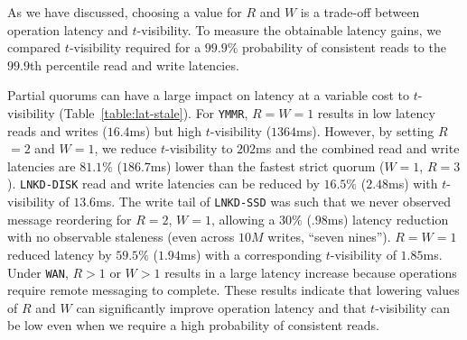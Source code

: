 \documentclass{vldb}
\begin{document}
As we have discussed, choosing a value for $R$ and $W$ is a trade-off
between operation latency and $t$-visibility. To measure the
obtainable latency gains, we compared $t$-visibility required for a
$99.9\%$ probability of consistent reads to the $99.9$th percentile
read and write latencies.

Partial quorums can have a large impact on latency at a variable cost
to $t$-visibility (Table~\ref{table:lat-stale}).  For \texttt{YMMR},
$R$$=$$W$$=$$1$ results in low latency reads and writes ($16.4$ms) but
high $t$-visibility ($1364$ms). However, by setting $R$$=$$2$ and
$W$$=$$1$, we reduce $t$-visibility to $202$ms and the combined read
and write latencies are $81.1\%$ ($186.7$ms) lower than the fastest
strict quorum ($W$$=$$1$, $R$$=$$3$).  \texttt{LNKD-DISK}
read and write latencies can be reduced by $16.5\%$ ($2.48$ms) with
$t$-visibility of $13.6$ms.  The write tail of \texttt{LNKD-SSD} was
such that we never observed message reordering for $R$$=$$2$,
$W$$=$$1$, allowing a $30\%$ ($.98$ms) latency reduction with no
observable staleness (even across $10M$ writes, ``seven nines'').
$R$$=$$W$$=$$1$ reduced latency by $59.5\%$ ($1.94$ms) with a
corresponding $t$-visibility of $1.85$ms.  Under \texttt{WAN}, $R > 1$
or $W > 1$ results in a large latency increase because operations
require remote messaging to complete. These results indicate that
lowering values of $R$ and $W$ can significantly improve operation
latency and that $t$-visibility can be low even when we require a high
probability of consistent reads.
\end{document}
